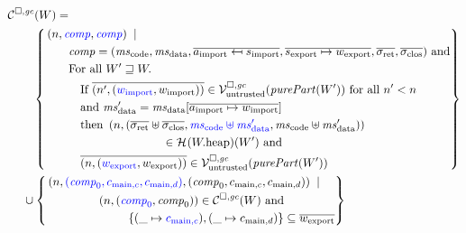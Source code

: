 \begin{jversion}
\begin{definition}
  \label{def:component-rel}
\begin{align*}
  \lrcomp(W) &=\\
  &\hspace{-.7cm}\left\{\begin{aligned}
     &\npair{\src{\var{comp}},\src{\var{comp}}} \;\mid \;\\
      &\qquad\var{comp} = (\mscode,\msdata,\overline{a_{\mathrm{import}} \mapsfrom s_{\mathrm{import}}},\overline{s_{\mathrm{export}} \mapsto w_{\mathrm{export}}},\sigrets,\sigcloss) \text{ and} \\
      &\qquad\text{For all } W' \future W \ldotp \\
      &\qquad\quad\text{If } \overline{\npair[n']{(\src{w_{\mathrm{import}}},w_{\mathrm{import}})}} \in \lrv(\purePart{W'}) \text{ for all $n' < n$}\\
      &\qquad\quad\text{and } \msdata' = \msdata{}[\overline{a_{\mathrm{import}} \mapsto w_{\mathrm{import}}}] \\
      &\qquad\quad\text{then } \npair{(\sigrets\uplus\sigcloss,\src{\mscode\uplus \msdata'}, \mscode\uplus\msdata')} \\
      &\qquad\qquad\qquad\qquad\qquad\in\lrheap(\pwheap)(W') \text{ and }\\
      &\qquad\quad\overline{\npair{(\src{w_{\mathrm{export}}},w_{\mathrm{export}})}} \in \lrv(\purePart{W'})
  \end{aligned}
    \right\}\\
  &\hspace{-1cm}\cup \left\{
    \begin{multlined}
     \npair{\src{(\var{comp}_0,c_{\mathrm{main},c}, c_{\mathrm{main},d})},(\var{comp}_0,c_{\mathrm{main},c}, c_{\mathrm{main},d})} \;\mid \;\\
     \npair{(\src{\var{comp}_0},\var{comp}_0)} \in \lrcomp(W) \text{ and}\\
     \{(\_ \mapsto \src{c_{\mathrm{main},c}}),(\_ \mapsto c_{\mathrm{main},d})\} \subseteq \overline{w_{\mathrm{export}}}
       \end{multlined}
    \right\} 
\end{align*}
\end{definition}


\end{jversion}
